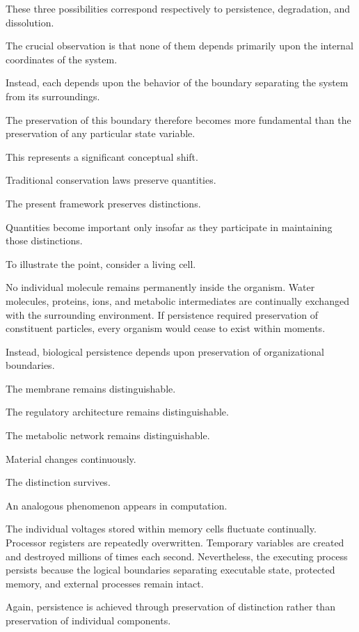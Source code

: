 \documentclass[11pt]{book}
\numberwithin{equation}{chapter}
\theoremstyle{definition}
\theoremstyle{plain}
\begin{document}
These three possibilities correspond respectively to persistence, degradation, and dissolution.

The crucial observation is that none of them depends primarily upon the internal coordinates of the system.

Instead, each depends upon the behavior of the boundary separating the system from its surroundings.

The preservation of this boundary therefore becomes more fundamental than the preservation of any particular state variable.

This represents a significant conceptual shift.

Traditional conservation laws preserve quantities.

The present framework preserves distinctions.

Quantities become important only insofar as they participate in maintaining those distinctions.

To illustrate the point, consider a living cell.

No individual molecule remains permanently inside the organism. Water molecules, proteins, ions, and metabolic intermediates are continually exchanged with the surrounding environment. If persistence required preservation of constituent particles, every organism would cease to exist within moments.

Instead, biological persistence depends upon preservation of organizational boundaries.

The membrane remains distinguishable.

The regulatory architecture remains distinguishable.

The metabolic network remains distinguishable.

Material changes continuously.

The distinction survives.

An analogous phenomenon appears in computation.

The individual voltages stored within memory cells fluctuate continually. Processor registers are repeatedly overwritten. Temporary variables are created and destroyed millions of times each second. Nevertheless, the executing process persists because the logical boundaries separating executable state, protected memory, and external processes remain intact.

Again, persistence is achieved through preservation of distinction rather than preservation of individual components.
\end{document}
